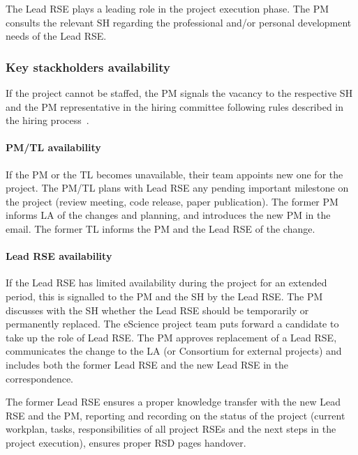 The Lead RSE plays a leading role in the project execution phase. The PM consults the relevant SH regarding the
professional and/or personal development needs of the Lead RSE.


\subsubsection{Key stackholders availability}

If %
the project cannot be staffed, the PM signals the vacancy to the respective
SH and the PM representative in the hiring committee following rules described in the hiring process~\cite{hiring-intranet}.

\paragraph{PM/TL availability} If the PM or the TL becomes unavailable, their team appoints new one for the project.
The PM/TL plans with Lead RSE any pending important milestone on the project (review meeting, code release, paper publication).
The former PM informs LA of the changes and planning, and introduces the new PM in the email. The former TL informs the PM and the Lead RSE of the change.

\paragraph{Lead RSE availability}
If the Lead RSE has limited availability during the project for an extended period, this is signalled to the PM and the
SH by the Lead RSE. The PM discusses with the SH whether the Lead RSE should be temporarily or permanently replaced.
The eScience project team puts forward a candidate to take up the role of Lead RSE. The PM approves replacement of a Lead RSE, 
communicates the change to the LA (or Consortium for external projects) and includes both the former Lead RSE and the
new Lead RSE in the correspondence.

The former Lead RSE ensures a proper knowledge transfer with the new Lead RSE and the PM, 
reporting and recording on the status of the project (current workplan, tasks, responsibilities of all project RSEs 
and the next steps in the project execution), ensures proper RSD pages handover. 

